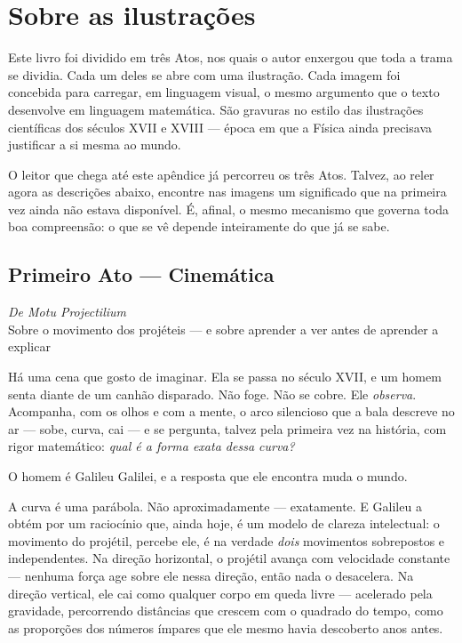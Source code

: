 

\chapter{Sobre as ilustrações} \label{apendice-ilustrações}

Este livro foi dividido em três Atos, nos quais o autor enxergou que toda a trama se dividia. Cada um deles se abre com uma ilustração. Cada imagem foi concebida para
carregar, em linguagem visual, o mesmo argumento que o texto desenvolve
em linguagem matemática. São gravuras no estilo das ilustrações
científicas dos séculos XVII e XVIII --- época em que a Física ainda
precisava justificar a si mesma ao mundo.

O leitor que chega até este apêndice já percorreu os três Atos. Talvez,
ao reler agora as descrições abaixo, encontre nas imagens um significado
que na primeira vez ainda não estava disponível. É, afinal, o mesmo
mecanismo que governa toda boa compreensão: o que se vê depende
inteiramente do que já se sabe.


\section*{Primeiro Ato --- Cinemática}



\begin{center}
    \textit{De Motu Projectilium} \\[0.2cm]
    {\small Sobre o movimento dos projéteis --- e sobre aprender a ver antes de aprender a explicar}
\end{center}

\bigskip

Há uma cena que gosto de imaginar. Ela se passa no século XVII, e um homem senta diante de um canhão disparado. Não
foge. Não se cobre. Ele \textit{observa}. Acompanha, com os olhos e com
a mente, o arco silencioso que a bala descreve no ar --- sobe, curva,
cai --- e se pergunta, talvez pela primeira vez na história, com rigor
matemático: \textit{qual é a forma exata dessa curva?}

O homem é Galileu Galilei, e a resposta que ele encontra muda o mundo.

A curva é uma parábola. Não aproximadamente --- exatamente. E Galileu a
obtém por um raciocínio que, ainda hoje, é um modelo de clareza
intelectual: o movimento do projétil, percebe ele, é na verdade
\textit{dois} movimentos sobrepostos e independentes. Na direção
horizontal, o projétil avança com velocidade constante --- nenhuma força
age sobre ele nessa direção, então nada o desacelera. Na direção
vertical, ele cai como qualquer corpo em queda livre --- acelerado pela
gravidade, percorrendo distâncias que crescem com o quadrado do tempo,
como as proporções dos números ímpares que ele mesmo havia descoberto
anos antes.

